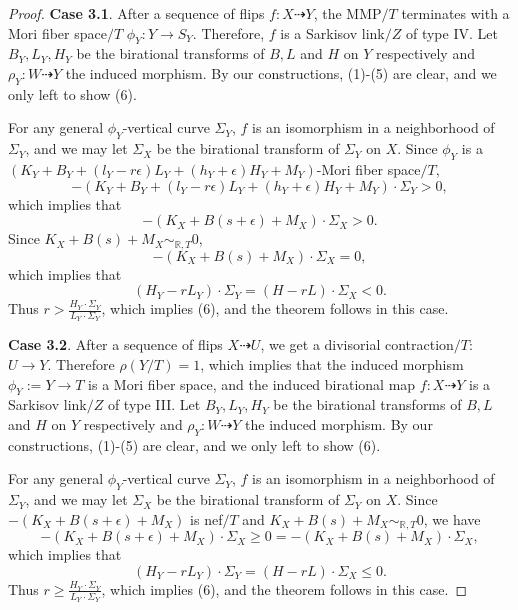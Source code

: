 \documentclass[11pt]{amsart}
\numberwithin{equation}{section}
\newcommand{\Rr}{\mathbb{R}}
\theoremstyle{definition}
\theoremstyle{definition}
\theoremstyle{definition}
\begin{document}
\begin{proof}
\medskip


\noindent\textbf{Case 3.1}. After a sequence of flips $f: X\dashrightarrow Y$, the MMP$/T$ terminates with a Mori fiber space$/T$ $\phi_Y: Y\rightarrow S_Y$. Therefore, $f$ is a Sarkisov link$/Z$ of type IV.  Let $B_Y,L_Y,H_Y$ be the birational transforms of $B,L$ and $H$ on $Y$ respectively and $\rho_Y: W\dashrightarrow Y$ the induced morphism. By our constructions, (1)-(5) are clear, and we only left to show (6).

For any general $\phi_Y$-vertical curve $\Sigma_Y$, $f$ is an isomorphism in a neighborhood of $\Sigma_Y$, and we may let $\Sigma_X$ be the birational transform of $\Sigma_Y$ on $X$. Since $\phi_Y$ is a $(K_Y+B_Y+(l_Y-r\epsilon)L_Y+(h_Y+\epsilon)H_Y+M_Y)$-Mori fiber space$/T$, 
$$-(K_Y+B_Y+(l_Y-r\epsilon)L_Y+(h_Y+\epsilon)H_Y+M_Y)\cdot\Sigma_Y>0,$$
which implies that
$$-(K_X+B(s+\epsilon)+M_X)\cdot\Sigma_X>0.$$
Since $K_X+B(s)+M_X\sim_{\Rr,T}0$, 
$$-(K_X+B(s)+M_X)\cdot\Sigma_X=0,$$
which implies that 
$$(H_Y-rL_Y)\cdot\Sigma_Y=(H-rL)\cdot\Sigma_X<0.$$ 
Thus $r>\frac{H_Y\cdot\Sigma_Y}{L_Y\cdot\Sigma_Y}$, which implies (6), and the theorem follows in this case.

\medskip

\noindent\textbf{Case 3.2}. After a sequence of flips $X\dashrightarrow U$, we get a divisorial contraction$/T$: $U\rightarrow Y$. Therefore $\rho(Y/T)=1$, which implies that the induced morphism $\phi_Y:=Y\rightarrow T$ is a Mori fiber space, and the induced birational map $f: X\dashrightarrow Y$ is a Sarkisov link$/Z$ of type III. Let $B_Y,L_Y,H_Y$ be the birational transforms of $B,L$ and $H$ on $Y$ respectively and $\rho_Y: W\dashrightarrow Y$ the induced morphism. By our constructions, (1)-(5) are clear, and we only left to show (6).

For any general $\phi_Y$-vertical curve $\Sigma_Y$, $f$ is an isomorphism in a neighborhood of $\Sigma_Y$, and we may let $\Sigma_X$ be the birational transform of $\Sigma_Y$ on $X$. Since $-(K_X+B(s+\epsilon)+M_X)$ is nef$/T$ and $K_X+B(s)+M_X\sim_{\Rr,T}0$, we have
$$-(K_X+B(s+\epsilon)+M_X)\cdot\Sigma_X\geq 0=-(K_X+B(s)+M_X)\cdot\Sigma_X,$$
which implies that 
$$(H_Y-rL_Y)\cdot\Sigma_Y=(H-rL)\cdot\Sigma_X\leq 0.$$ 
Thus $r\geq\frac{H_Y\cdot\Sigma_Y}{L_Y\cdot\Sigma_Y}$, which implies (6), and the theorem follows in this case.

\medskip


\end{proof}
\end{document}
